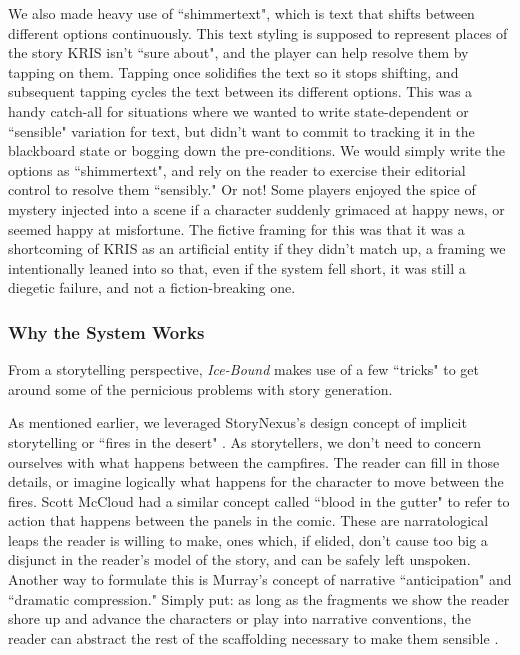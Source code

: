We also made heavy use of ``shimmertext", which is text that shifts between different options continuously. This text styling is supposed to represent places of the story KRIS isn't ``sure about", and the player can help resolve them by tapping on them. Tapping once solidifies the text so it stops shifting, and subsequent tapping cycles the text between its different options. This was a handy catch-all for situations where we wanted to write state-dependent or ``sensible" variation for text, but didn't want to commit to tracking it in the blackboard state or bogging down the pre-conditions. We would simply write the options as ``shimmertext", and rely on the reader to exercise their editorial control to resolve them ``sensibly." Or not! Some players enjoyed the spice of mystery injected into a scene if a character suddenly grimaced at happy news, or seemed happy at misfortune. The fictive framing for this was that it was a shortcoming of KRIS as an artificial entity if they didn't match up, a framing we intentionally leaned into so that, even if the system fell short, it was still a diegetic failure, and not a fiction-breaking one.

\subsubsection{Why the System Works}\label{subsubsec:why-the-system-works}

From a storytelling perspective, \textit{Ice-Bound} makes use of a few ``tricks" to get around some of the pernicious problems with story generation.

As mentioned earlier, we leveraged StoryNexus's design concept of implicit storytelling or ``fires in the desert" \cite{arendt_structuresThree}. As storytellers, we don't need to concern ourselves with what happens between the campfires. The reader can fill in those details, or imagine logically what happens for the character to move between the fires. Scott McCloud had a similar concept called ``blood in the gutter" \cite{mccloud_1994} to refer to action that happens between the panels in the comic. These are narratological leaps the reader is willing to make, ones which, if elided, don't cause too big a disjunct in the reader's model of the story, and can be safely left unspoken. Another way to formulate this is Murray's concept of narrative ``anticipation" and ``dramatic compression." Simply put: as long as the fragments we show the reader shore up and advance the characters or play into narrative conventions, the reader can abstract the rest of the scaffolding necessary to make them sensible \cite{murray_compression}.

